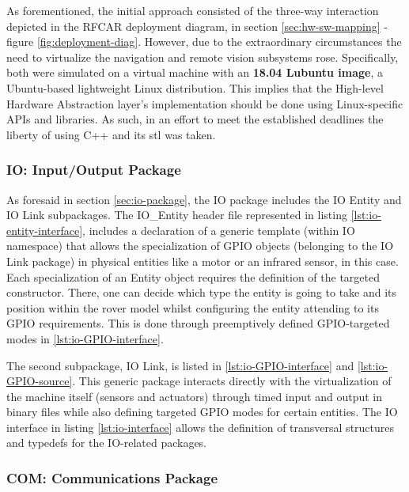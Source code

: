 As forementioned, the initial approach consisted of the three-way interaction depicted in the RFCAR deployment diagram, in section \ref{sec:hw-sw-mapping} - figure \ref{fig:deployment-diag}. However, due to the extraordinary circumstances the need to virtualize the navigation and remote vision subsystems rose. Specifically, both were simulated on a virtual machine with an \textbf{18.04 Lubuntu image}, a Ubuntu-based lightweight Linux distribution. This implies that the High-level Hardware Abstraction layer's implementation should be done using Linux-specific APIs and libraries. As such, in an effort to meet the established deadlines the liberty of using C++ and its \gls{stl} was taken. 
%
\subsubsection{IO: Input/Output Package}
As foresaid in section \ref{sec:io-package}, the IO package includes the IO Entity and IO Link subpackages. The IO\_Entity header file represented in listing \ref{lst:io-entity-interface}, includes a declaration of a generic template (within IO namespace) that allows the specialization of GPIO objects (belonging to the IO Link package) in physical entities like a motor or an infrared sensor, in this case. Each specialization of an Entity object requires the definition of the targeted constructor. There, one can decide which type the entity is going to take and its position within the rover model whilst configuring the entity attending to its GPIO requirements. This is done through preemptively defined GPIO-targeted modes in \ref{lst:io-GPIO-interface}.\par
%
The second subpackage, IO Link, is listed in \ref{lst:io-GPIO-interface} and \ref{lst:io-GPIO-source}. This generic package interacts directly with the virtualization of the machine itself (sensors and actuators) through timed input and output in binary files while also defining targeted GPIO modes for certain entities. The IO interface in listing \ref{lst:io-interface} allows the definition of transversal structures and typedefs for the IO-related packages.
%

%
%
\subsubsection{COM: Communications Package}
